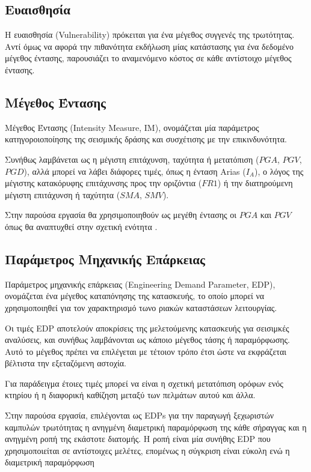 \subsection{Ευαισθησία}
Η ευαισθησία (Vulnerability) πρόκειται για ένα μέγεθος συγγενές της τρωτότητας. Αντί όμως να αφορά την πιθανότητα εκδήλωση μίας κατάστασης για ένα δεδομένο μέγεθος έντασης, παρουσιάζει το αναμενόμενο κόστος σε κάθε αντίστοιχο μέγεθος έντασης.

\subsection{Μέγεθος Έντασης}
Μέγεθος Έντασης (Intensity Measure, IM), ονομάζεται μία παράμετρος κατηγοροιοποίησης της σεισμικής δράσης και συσχέτισης με την επικινδυνότητα.

Συνήθως λαμβάνεται ως η μέγιστη επιτάχυνση, ταχύτητα ή μετατόπιση ($PGA$, $PGV$, $PGD$), αλλά μπορεί να λάβει διάφορες τιμές, όπως η ένταση Arias ($I_A$), ο λόγος της μέγιστης κατακόρυφης επιτάχυνσης προς την οριζόντια ($FR1$) ή την διατηρούμενη μέγιστη επιτάχυνση ή ταχύτητα ($SMA$, $SMV$).

Στην παρούσα εργασία θα χρησιμοποιηθούν ως μεγέθη έντασης οι $PGA$ και $PGV$ όπως θα αναπτυχθεί στην σχετική ενότητα \parencite{Huang}.

\subsection{Παράμετρος Μηχανικής Επάρκειας}
Παράμετρος μηχανικής επάρκειας (Engineering Demand Parameter, EDP), ονομάζεται ένα μέγεθος καταπόνησης της κατασκευής, το οποίο μπορεί να χρησιμοποιηθεί για τον χαρακτηρισμό τωνο ριακών καταστάσεων λειτουργίας.

Οι τιμές EDP αποτελούν αποκρίσεις της μελετούμενης κατασκευής για σεισιμκές αναλύσεις, και συνήθως λαμβάνονται ως κάποιο μέγεθος τάσης ή παραμόρφωσης. Αυτό το μέγεθος πρέπει να επιλέγεται με τέτοιον τρόπο έτσι ώστε να εκφράζεται βέλτιστα την εξεταζόμενη αστοχία.

Για παράδειγμα έτοιες τιμές μπορεί να είναι η σχετική μετατόπιση ορόφων ενός κτηρίου ή η διαφορική καθίζηση μεταξύ των πελμάτων αυτού και άλλα.

Στην παρούσα εργασία, επιλέγονται ως EDPs για την παραγωγή ξεχωριστών καμπυλών τρωτότητας η ανηγμένη διαμετρική παραμόρφωση της κάθε σήραγγας και η ανηγμένη ροπή της εκάστοτε διατομής. Η ροπή είναι μία συνήθης EDP που χρησιμοποιείται σε αντίστοιχες μελέτες, επομένως η σύγκριση είναι εύκολη ενώ η διαμετρική παραμόρφωση 

